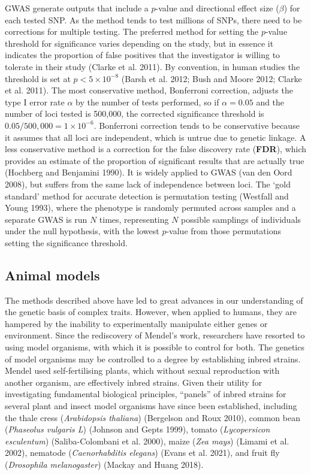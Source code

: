 \documentclass[
]{book}
\begin{document}
GWAS generate outputs that include a \(p\)-value and directional effect size (\(\beta\)) for each tested SNP. As the method tends to test millions of SNPs, there need to be corrections for multiple testing. The preferred method for setting the \(p\)-value threshold for significance varies depending on the study, but in essence it indicates the proportion of false positives that the investigator is willing to tolerate in their study (Clarke et al. 2011). By convention, in human studies the threshold is set at \(p < 5 \times 10^{-8}\) (Barsh et al. 2012; Bush and Moore 2012; Clarke et al. 2011). The most conservative method, Bonferroni correction, adjusts the type I error rate \(\alpha\) by the number of tests performed, so if \(\alpha = 0.05\) and the number of loci tested is 500,000, the corrected significance threshold is \(0.05 / 500,000 = 1\times10^{-6}\). Bonferroni correction tends to be conservative because it assumes that all loci are independent, which is untrue due to genetic linkage. A less conservative method is a correction for the false discovery rate (\textbf{FDR}), which provides an estimate of the proportion of significant results that are actually true (Hochberg and Benjamini 1990). It is widely applied to GWAS (van den Oord 2008), but suffers from the same lack of independence between loci. The `gold standard' method for accurate detection is permutation testing (Westfall and Young 1993), where the phenotype is randomly permuted across samples and a separate GWAS is run \(N\) times, representing \(N\) possible samplings of individuals under the null hypothesis, with the lowest \(p\)-value from those permutations setting the significance threshold.

\hypertarget{animal-models}{%
\subsection{Animal models}\label{animal-models}}

The methods described above have led to great advances in our understanding of the genetic basis of complex traits. However, when applied to humans, they are hampered by the inability to experimentally manipulate either genes or environment. Since the rediscovery of Mendel's work, researchers have resorted to using model organisms, with which it is possible to control for both. The genetics of model organisms may be controlled to a degree by establishing inbred strains. Mendel used self-fertilising plants, which without sexual reproduction with another organism, are effectively inbred strains. Given their utility for investigating fundamental biological principles, ``panels'' of inbred strains for several plant and insect model organisms have since been established, including the thale cress (\emph{Arabidopsis thaliana}) (Bergelson and Roux 2010), common bean (\emph{Phaseolus vulgaris L}) (Johnson and Gepts 1999), tomato (\emph{Lycopersicon esculentum}) (Saliba-Colombani et al. 2000), maize (\emph{Zea mays}) (Limami et al. 2002), nematode (\emph{Caenorhabditis elegans}) (Evans et al. 2021), and fruit fly (\emph{Drosophila melanogaster}) (Mackay and Huang 2018).
\end{document}
